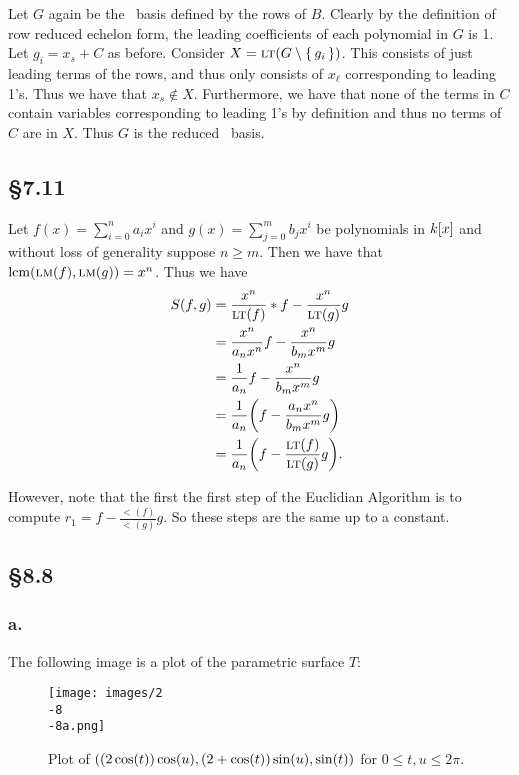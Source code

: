 \documentclass[letterpaper]{article}
\begin{document}
Let $G$ again be the \Grobner\ basis defined by the rows of $B$.
Clearly by the definition of row reduced echelon form, the leading coefficients of each polynomial in $G$ is 1.
Let $g_{i} = x_{s} + C$ as before.
Consider $X = \gen{\lt(G \setminus \set{g_{i}})}$.
This consists of just leading terms of the rows, and thus only consists of $x_{\ell}$ corresponding to leading 1's.
Thus we have that $x_{s} \notin X$.
Furthermore, we have that none of the terms in $C$ contain variables corresponding to leading 1's by definition and thus no terms of $C$ are in $X$.
Thus $G$ is the reduced \Grobner\ basis.

\subsection*{\S 7.11}

Let $f(x) = \sum_{i = 0}^{n} a_{i}x^{i}$ and $g(x) = \sum_{j = 0}^{m} b_{j} x^{i}$ be polynomials in $k\bqty{x}$ and without loss of generality suppose $n \geq m$.
Then we have that $\operatorname{lcm}(\operatorname{\textsc{lm}}(f), \operatorname{\textsc{lm}}(g)) = x^{n}$.
Thus we have
\begin{align*}
  S(f, g) &= \frac{x^{n}}{\lt(f)} * f - \frac{x^{n}}{\lt(g)}g \\
          &= \frac{x^{n}}{a_{n}x^{n}} f - \frac{x^{n}}{b_{m}x^{m}}g \\
          &= \frac{1}{a_{n}}f - \frac{x^{n}}{b_{m}x^{m}}g \\
          &= \frac{1}{a_{n}}\pqty{f - \frac{a_{n}x^{n}}{b_{m}x^{m}}g} \\
          &= \frac{1}{a_{n}}\pqty{f - \frac{\lt(f)}{\lt(g)}g}.
\end{align*}

However, note that the first the first step of the Euclidian Algorithm is to compute $r_{1} = f - \frac{\lt(f)}{\lt(g)}g$.
So these steps are the same up to a constant.

\clearpage

\subsection*{\S 8.8}

\subsubsection*{a.} The following image is a plot of the parametric surface $T\colon$

\begin{figure}[H]
  \centering
  \texttt{[image: images/2\\-8\\-8a.png]}
  \caption{Plot of $\pqty{(2 \cos(t))\cos(u), (2 + \cos(t))\sin(u), \sin(t)}$ for $0 \leq t, u \leq 2 \pi$.}
\end{figure}
\end{document}
